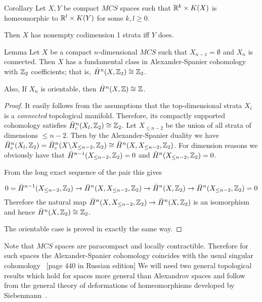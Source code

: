 \begin{thm}{Corollary}
Let $X,Y$ be compact $MCS$ spaces such that $\RR^k\times K(X)$ is homeomorphic to $\RR^l\times K(Y)$ for some $k,l\ge 0$.

Then $X$ has nonempty codimension 1 strata iff $Y$ does.
\end{thm}
\begin{thm}{Lemma}\label{top-gr-pet}
Let $X$ be a  compact $n$-dimensional $MCS$ such that $X_{n-1}=\emptyset$ and $X_n$ is connected.
Then $X$ has a fundamental class in Alexander-Spanier cohomology with $\mathbb{Z}_2$ coefficients; that is, $\bar H^{n}(X,\mathbb{Z}_2)\cong \mathbb{Z}_2$. 

Also, If $X_n$ is orientable, then   $\bar H^{n}(X,\mathbb{Z})\cong \mathbb{Z}$. 
\end{thm}
\begin{proof}
It easily follows from the assumptions that the top-dimensional strata $X_l$ is a {\it connected} topological manifold. Therefore, its compactly supported cohomology satisfies $\bar H^n_c(X_l,\mathbb{Z}_2)\cong \mathbb{Z}_2$.
Let $X_{\le n-2}$ be the union of all strata of dimensions $\le n-2$. Then by the Alexander-Spanier duality we have $\bar H^n_c(X_l,\ZZ_2)=\bar H^n_c(X\backslash X_{\le n-2},\ZZ_2)\cong \bar H^n(X, X_{\le n-2},\ZZ_2)$. 
For dimension reasons we obviously have that $\bar H^{n-1}(X_{\le n-2},\ZZ_2)=0$ and $\bar H^{n}(X_{\le n-2},\ZZ_2)=0$.

From the long exact sequence of the pair this gives

\[
0=\bar H^{n-1}(X_{\le n-2},\ZZ_2)\to \bar H^n(X, X_{\le n-2},\ZZ_2)\to \bar H^n(X,\ZZ_2)\to \bar H^n(X_{\le n-2},\ZZ_2)=0
\]
Therefore the natural map $\bar H^n(X, X_{\le n-2},\ZZ_2)\to \bar H^n(X,\ZZ_2)$ is an isomorphism and hence $\bar H^{n}(X,\mathbb{Z}_2)\cong \mathbb{Z}_2$.

The orientable case is proved in exactly the same way.
\end{proof}

Note that $MCS$ spaces are paracompact and locally contractible. Therefore for such spaces  the Alexander-Spanier cohomology coincides with the usual singular cohomology ~\cite{Spanier}[page 440 in Russian edition]
We will need two general topological results which hold for spaces more general than  Alexandrov spaces and follow from the general theory of deformations of homeomorphisms developed by Siebenmann~\cite{Sieb}.

